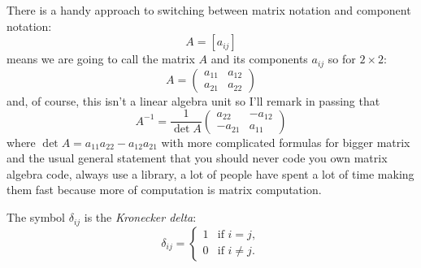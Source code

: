 \documentclass[12pt]{article}
\begin{document}
There is a handy approach to switching between matrix notation and component notation:
\begin{equation}
  A=[a_{ij}]
\end{equation}
means we are going to call the matrix $A$ and its components $a_{ij}$ so for $2\times 2$:
\begin{equation}
  A=\begin{pmatrix}
  a_{11}&a_{12}\\a_{21}&a_{22}
  \end{pmatrix}
\end{equation}
and, of course, this isn't a linear algebra unit so I'll remark in passing that
\begin{equation}
  A^{\mathsf -1}=\frac{1}{\det{A}}
\begin{pmatrix}
  a_{22}&-a_{12}\\-a_{21}&a_{11}
  \end{pmatrix}
\end{equation}
where $\det{A}=a_{11}a_{22}-a_{12}a_{21}$ with more complicated
formulas for bigger matrix and the usual general statement that you
should never code you own matrix algebra code, always use a library, a
lot of people have spent a lot of time making them fast because more
of computation is matrix computation.

The symbol $\delta_{ij}$ is the \emph{Kronecker delta}:
\begin{equation}
\delta_{ij} =
\begin{cases}
1 & \text{if } i = j, \\
0 & \text{if } i \ne j .
\end{cases}
\end{equation}
\end{document}
